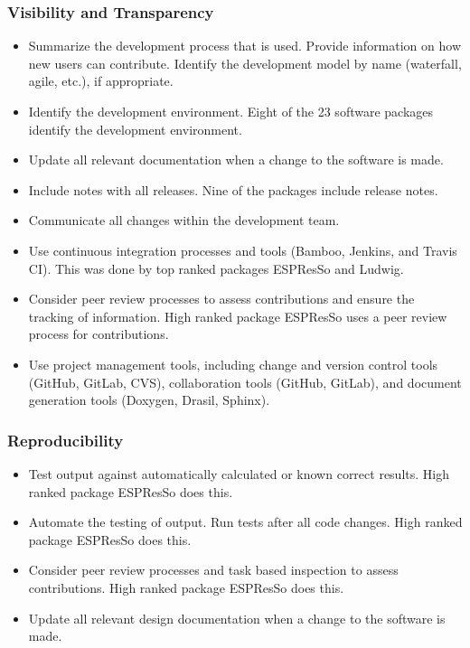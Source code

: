 \documentclass[12pt, notitlepage]{article}
\begin{document}
\subsubsection{Visibility and Transparency}

\begin{itemize}
	\item Summarize the development process that is used. Provide information on how new users can contribute. Identify the development model by name (waterfall, agile, etc.), if appropriate.
	\item Identify the development environment. Eight of the 23 software packages identify the development environment.
	\item Update all relevant documentation when a change to the software is made.
	\item Include notes with all releases. Nine of the packages include release notes.
	\item Communicate all changes within the development team.
	\item Use continuous integration processes and tools (Bamboo, Jenkins, and Travis CI). This was done by top ranked packages ESPResSo and Ludwig.
	\item Consider peer review processes to assess contributions and ensure the tracking of information. High ranked package ESPResSo uses a peer review process for contributions. 
	\item Use project management tools, including change and version control tools (GitHub, GitLab, CVS), collaboration tools (GitHub, GitLab), and document generation tools (Doxygen, Drasil, Sphinx).
\end{itemize}

\subsubsection{Reproducibility}

\begin{itemize}
	\item Test output against automatically calculated or known correct results. High ranked package ESPResSo does this.
	\item Automate the testing of output. Run tests after all code changes. High ranked package ESPResSo does this.
	\item Consider peer review processes and task based inspection to assess contributions. High ranked package ESPResSo does this.
	\item Update all relevant design documentation when a change to the software is made.
\end{itemize}
\end{document}

